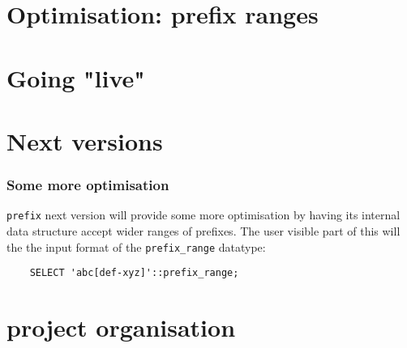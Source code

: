 \documentclass{beamer}
\begin{document}

\section{Optimisation: prefix ranges}


\section{Going "live"}


\section{Next versions}

\begin{frame}[fragile]
  \frametitle{Some more optimisation}
  
  \texttt{prefix} next version will provide some more optimisation
  by having its internal data structure accept wider ranges of prefixes.
  The user visible part of this will the the input format of the \texttt{prefix\_range}
  datatype:
  
  \begin{example}
  \begin{verbatim}
    SELECT 'abc[def-xyz]'::prefix_range;
  \end{verbatim}
  \end{example}
\end{frame}

\section{project organisation}

\end{document}
